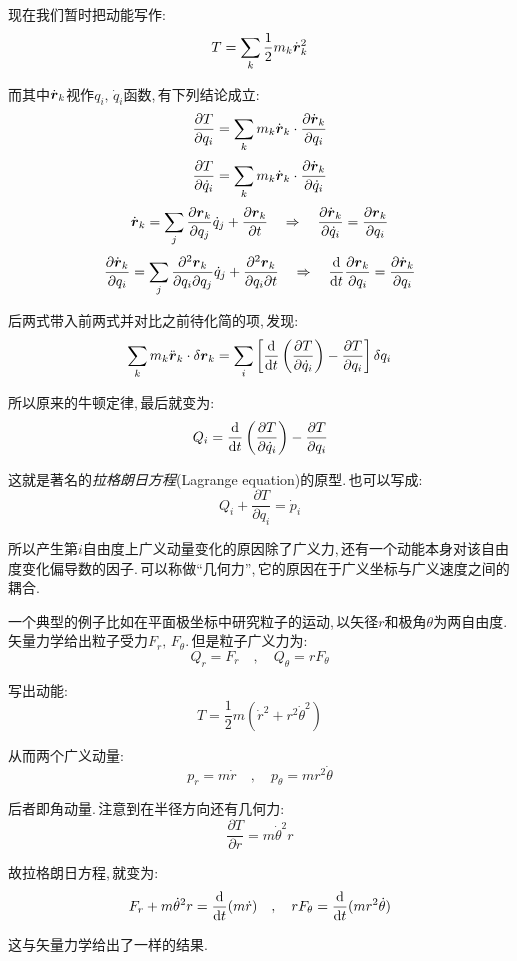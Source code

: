 现在我们暂时把动能写作:
\[T=\sum_k\frac{1}{2}m_k \dot {\boldsymbol{r}}_k^2\]

而其中$\dot {\boldsymbol{r}}_k$视作$q_i,\,\dot{q}_i$函数,\,有下列结论成立:
\[\frac{\partial T}{\partial q_i}=\sum_k m_k\dot {\boldsymbol{r}}_k\cdot \frac{\partial \dot {\boldsymbol{r}}_k}{\partial q_i}\]
\[\frac{\partial T}{\partial \dot{q}_i}=\sum_k m_k\dot {\boldsymbol{r}}_k\cdot \frac{\partial \dot {\boldsymbol{r}}_k}{\partial \dot{q}_i}\]
\[\dot {\boldsymbol{r}}_k=\sum_j\frac{\partial \boldsymbol{r}_k}{\partial q_j}\dot{q}_j+\frac{\partial \boldsymbol{r}_k}{\partial t}\quad\Rightarrow \quad \frac{\partial \dot {\boldsymbol{r}}_k}{\partial \dot{q}_i}=\frac{\partial \boldsymbol{r}_k}{\partial q_i}\]
\[\frac{\partial \dot {\boldsymbol{r}}_k}{\partial q_i}=\sum_j\frac{\partial^2 \boldsymbol{r}_k}{\partial q_i\partial q_j}\dot{q}_j+\frac{\partial^2 \boldsymbol{r}_k}{\partial q_i\partial t}\quad\Rightarrow \quad \frac{\textrm{d} }{\textrm{d} t}\frac{\partial \boldsymbol{r}_k}{\partial q_i}=\frac{\partial \dot {\boldsymbol{r}}_k}{\partial q_i}\]

后两式带入前两式并对比之前待化简的项,\,发现:
\[\sum_k m_k \ddot{\boldsymbol{r}}_k\cdot \delta \boldsymbol{r}_k=\sum_i\left[\frac{\textrm{d} }{\textrm{d} t}\left(\frac{\partial T}{\partial \dot{q}_i}\right)-\frac{\partial T}{\partial q_i}\right]\delta q_i\]

所以原来的牛顿定律,\,最后就变为:
\[Q_i=\frac{\textrm{d} }{\textrm{d} t}\left(\frac{\partial T}{\partial \dot{q}_i}\right)-\frac{\partial T}{\partial q_i}\]

这就是著名的\emph{拉格朗日方程}(Lagrange equation)的原型.\,也可以写成:
\[Q_i+\frac{\partial T}{\partial q_i}=\dot{p}_i\]

所以产生第$i$自由度上广义动量变化的原因除了广义力,\,还有一个动能本身对该自由度变化偏导数的因子.\,可以称做``几何力'',\,它的原因在于广义坐标与广义速度之间的耦合.

一个典型的例子比如在平面极坐标中研究粒子的运动,\,以矢径$r$和极角$\theta$为两自由度.\,矢量力学给出粒子受力$F_r,\,F_\theta$.\,但是粒子广义力为:
\[Q_r=F_r\quad,\quad Q_\theta=rF_\theta\]

写出动能:
\[T=\frac{1}{2}m(\dot{r}^2+r^2\dot{\theta}^2)\]

从而两个广义动量:
\[p_r=m\dot{r}\quad,\quad p_\theta=mr^2\dot{\theta}\]

后者即角动量.\,注意到在半径方向还有几何力:
\[\frac{\partial T}{\partial r}=m\dot{\theta}^2r\]

故拉格朗日方程,\,就变为:
\[F_r+m\dot{\theta}^2r=\frac{\textrm{d}}{\textrm{d} t}(m\dot{r})\quad ,\quad rF_\theta =\frac{\textrm{d}}{\textrm{d} t}(mr^2\dot{\theta})\]

这与矢量力学给出了一样的结果.

